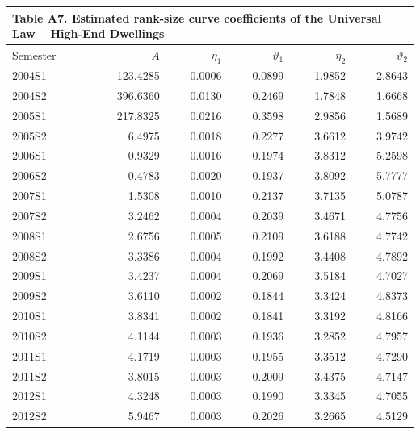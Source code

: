 \clearpage
\begin{landscape}
\begin{table}[!ht]
  \centering
  \footnotesize
  \setlength{\tabcolsep}{4pt}
  \renewcommand{\arraystretch}{0.80}
  \begin{tabular}{lrrrrr}
    \multicolumn{6}{l}{\small\textbf{Table A7. Estimated rank-size curve coefficients of the Universal Law -- High-End Dwellings}} \\[3pt]
    \hline
    Semester & $A$ & $\eta_{1}$ & $\vartheta_{1}$ & $\eta_{2}$ & $\vartheta_{2}$ \\
    \hline
    2004S1 & 123.4285 & 0.0006 & 0.0899 & 1.9852 & 2.8643 \\
    2004S2 & 396.6360 & 0.0130 & 0.2469 & 1.7848 & 1.6668 \\
    2005S1 & 217.8325 & 0.0216 & 0.3598 & 2.9856 & 1.5689 \\
    2005S2 &   6.4975 & 0.0018 & 0.2277 & 3.6612 & 3.9742 \\
    2006S1 &   0.9329 & 0.0016 & 0.1974 & 3.8312 & 5.2598 \\
    2006S2 &   0.4783 & 0.0020 & 0.1937 & 3.8092 & 5.7777 \\
    2007S1 &   1.5308 & 0.0010 & 0.2137 & 3.7135 & 5.0787 \\
    2007S2 &   3.2462 & 0.0004 & 0.2039 & 3.4671 & 4.7756 \\
    2008S1 &   2.6756 & 0.0005 & 0.2109 & 3.6188 & 4.7742 \\
    2008S2 &   3.3386 & 0.0004 & 0.1992 & 3.4408 & 4.7892 \\
    2009S1 &   3.4237 & 0.0004 & 0.2069 & 3.5184 & 4.7027 \\
    2009S2 &   3.6110 & 0.0002 & 0.1844 & 3.3424 & 4.8373 \\
    2010S1 &   3.8341 & 0.0002 & 0.1841 & 3.3192 & 4.8166 \\
    2010S2 &   4.1144 & 0.0003 & 0.1936 & 3.2852 & 4.7957 \\
    2011S1 &   4.1719 & 0.0003 & 0.1955 & 3.3512 & 4.7290 \\
    2011S2 &   3.8015 & 0.0003 & 0.2009 & 3.4375 & 4.7147 \\
    2012S1 &   4.3248 & 0.0003 & 0.1990 & 3.3345 & 4.7055 \\
    2012S2 &   5.9467 & 0.0003 & 0.2026 & 3.2665 & 4.5129 \\

\end{tabular}
\end{table}
\end{landscape}

